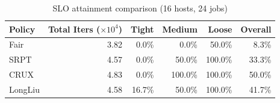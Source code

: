 \begin{table}[t]
\centering
\caption{SLO attainment comparison (16 hosts, 24 jobs)}
\label{tab:slo_16host}
\begin{tabular}{l|r|r|r|r|r}
\hline
Policy & Total Iters ($\times 10^4$) & Tight & Medium & Loose & Overall \\
\hline
Fair & 3.82 & 0.0\% & 0.0\% & 50.0\% & 8.3\% \\
SRPT & 4.57 & 0.0\% & 50.0\% & 100.0\% & 33.3\% \\
CRUX & 4.83 & 0.0\% & 100.0\% & 100.0\% & 50.0\% \\
LongLiu & 4.58 & 16.7\% & 50.0\% & 100.0\% & 41.7\% \\
\hline
\end{tabular}
\end{table}
